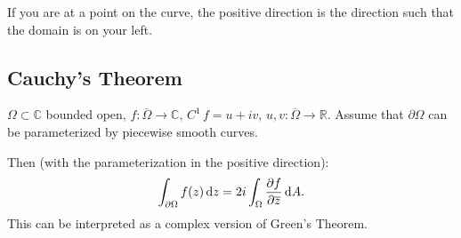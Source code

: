 
    





















If you are at a point on the curve, the positive direction is the direction such that the domain is on your left.

\subsection{Cauchy's Theorem}


\begin{proposition}\label{prop:green-theorem}
$\Omega \subset \mathbb{C}$ bounded open, $f:\overline{\Omega} \rightarrow \mathbb{C}, \, C^1 \, f = u+iv, \, u,v:\overline{\Omega} \rightarrow \mathbb{R}$. Assume that $\partial \Omega$ can be parameterized by piecewise smooth curves.

Then (with the parameterization in the positive direction):
\begin{align*}
    \int_{\partial \Omega} f(z)  \dif z = 2i \int_\Omega \frac{\partial f}{ \partial \overline{z}}  \dif A .
\end{align*}
This can be interpreted as a complex version of Green's Theorem.
\end{proposition}

